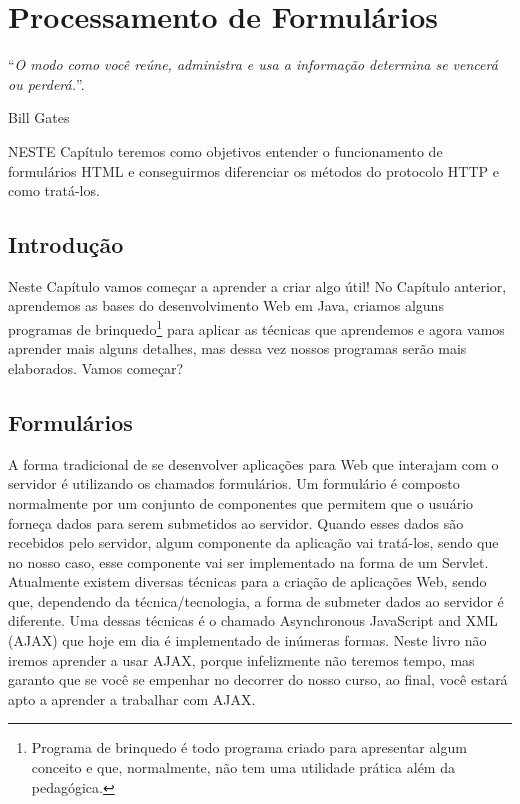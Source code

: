 \chapter{Processamento de Formulários}
\epigraph{``\textit{O modo como você reúne, administra e usa a informação determina se vencerá ou perderá.}''.}{Bill Gates}

\lettrine[lines=4, lhang=0.1, lraise=0, loversize=0.2, findent=0.1em]{\textcolor{corAzulTema}{N}}{ESTE} Capítulo teremos como objetivos entender o funcionamento de formulários HTML e conseguirmos diferenciar os métodos do protocolo HTTP e como tratá-los.


\section{Introdução}

Neste Capítulo vamos começar a aprender a criar algo útil! No Capítulo anterior, aprendemos as bases do desenvolvimento Web em Java, criamos alguns programas de brinquedo\footnote{Programa de brinquedo é todo programa criado para apresentar algum conceito e que, normalmente, não tem uma utilidade prática além da pedagógica.} para aplicar as técnicas que aprendemos e agora vamos aprender mais alguns detalhes, mas dessa vez nossos programas serão mais elaborados. Vamos começar?


\section{Formulários}

A forma tradicional de se desenvolver aplicações para Web que interajam com o servidor é utilizando os chamados formulários. Um formulário é composto normalmente por um conjunto de componentes que permitem que o usuário forneça dados para serem submetidos ao servidor. Quando esses dados são recebidos pelo servidor, algum componente da aplicação vai tratá-los, sendo que no nosso caso, esse componente vai ser implementado na forma de um Servlet.
Atualmente existem diversas técnicas para a criação de aplicações Web, sendo que, dependendo da técnica/tecnologia, a forma de submeter dados ao servidor é diferente. Uma dessas técnicas é o chamado Asynchronous JavaScript and XML (AJAX) que hoje em dia é implementado de inúmeras formas. Neste livro não iremos aprender a usar AJAX, porque infelizmente não teremos tempo, mas garanto que se você se empenhar no decorrer do nosso curso, ao final, você estará apto a aprender a trabalhar com AJAX.

